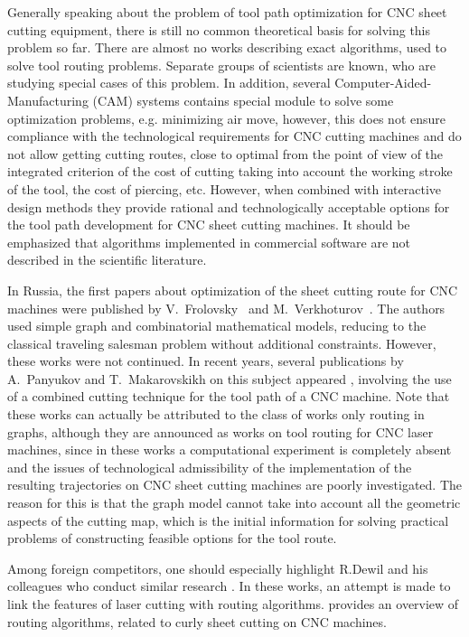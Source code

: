 \documentclass[10pt]{article}
\begin{document}
Generally speaking about the problem of tool path optimization
for CNC sheet cutting  equipment,
there is still no common theoretical basis for solving this problem
so far.
There are almost no works describing exact algorithms,
used to solve tool routing problems.
Separate groups of scientists are known,
who are studying special cases of this problem.
In addition,
several Computer-Aided-Manufacturing (CAM) systems
contains special module to solve some optimization problems,
e.g. minimizing air move,
however, this does not ensure compliance
with the technological requirements for CNC cutting machines
and do not allow getting cutting routes,
close to optimal from the point of view of the integrated criterion of the cost of cutting
taking into account the working stroke of the tool,
the cost of piercing, etc.
However, when combined with interactive design methods
they provide rational and technologically acceptable options
for the tool path development for CNC sheet cutting machines.
It should be emphasized that algorithms implemented in commercial software
are not described in the scientific literature.


In Russia,
the first papers about optimization of the sheet cutting route for CNC machines
were published by V.~Frolovsky~\cite{bibx:104}
and M.~Verkhoturov~\cite{bibx:105}.
The authors used simple graph and combinatorial mathematical models,
reducing to the classical traveling salesman problem without additional constraints.
However, these works were not continued.
In recent years,
several publications by A.~Panyukov
and T.~Makarovskikh on this subject
appeared
\cite{bibx:106,bibx:107,bibx:108},
involving the use of a combined cutting technique
for the tool path of a CNC machine.
Note that these works can actually be attributed to the class of works
only routing in graphs,
although they are announced as works on tool routing for CNC laser machines,
since in these works a computational experiment is completely absent
and the issues of technological admissibility of the implementation of the resulting trajectories on CNC sheet cutting machines are poorly investigated.
The reason for this is that the graph model
cannot take into account all the geometric aspects of the cutting map,
which is the initial information for solving practical problems of constructing feasible options for the tool route.

Among foreign competitors, one should especially highlight R.Dewil and his colleagues who conduct similar research \cite{bibx:100,bibx:109,bibx:110}.
In these works, an attempt is made to link the features of laser cutting with routing algorithms.
\cite{bibx:109} provides an overview of routing algorithms,
related to curly sheet cutting on CNC machines.
\end{document}
